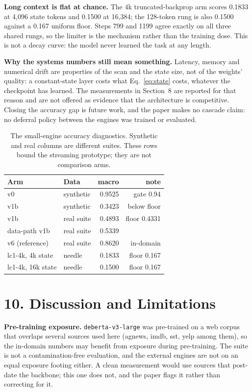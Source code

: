 \documentclass[11pt]{article}
\begin{document}
\textbf{Long context is flat at chance.}
The 4k truncated-backprop arm scores 0.1833 at 4{,}096 state tokens and 0.1500 at 16{,}384; the
128-token rung is also 0.1500 against a 0.167 uniform floor. Steps 799 and 1199 agree exactly on all
three shared rungs, so the limiter is the mechanism rather than the training dose. This is not a
decay curve: the model never learned the task at any length.

\textbf{Why the systems numbers still mean something.}
Latency, memory and numerical drift are properties of the scan and the state size, not of the
weights' quality: a constant-state layer costs what Eq.~\eqref{eq:state} costs, whatever the
checkpoint has learned. The measurements in Section~8 are reported for that reason
and are not offered as evidence that the architecture is competitive. Closing the accuracy gap is
future work, and the paper makes no cascade claim: no deferral policy between the engines was
trained or evaluated.

\begin{table}
\centering
\footnotesize
\caption{The small-engine accuracy diagnostics. Synthetic and real columns are different suites.
These rows bound the streaming prototype; they are not comparison arms.}\begin{tabular}{llrr}
\toprule
Arm & Data & macro & note \\
\midrule
v0 & synthetic & 0.9525 & gate 0.94 \\
v1b & synthetic & 0.3423 & below floor \\
v1b & real suite & 0.4893 & floor 0.4331 \\
data-path v1b & real suite & 0.5339 & \\
v6 (reference) & real suite & 0.8620 & in-domain \\
lc1-4k, 4k state & needle & 0.1833 & floor 0.167 \\
lc1-4k, 16k state & needle & 0.1500 & floor 0.167 \\
\bottomrule
\end{tabular}
\end{table}

\section*{10. Discussion and Limitations}
\textbf{Pre-training exposure.}
\texttt{deberta-v3-large} was pre-trained on a web corpus that overlaps several sources used here
(agnews, imdb, sst, yelp among them), so the in-domain numbers may benefit from exposure during
pre-training. The suite is not a contamination-free evaluation, and the external engines are not on
an equal exposure footing either. A clean measurement would use sources that post-date the backbone;
this one does not, and the paper flags it rather than correcting for it.
\end{document}
